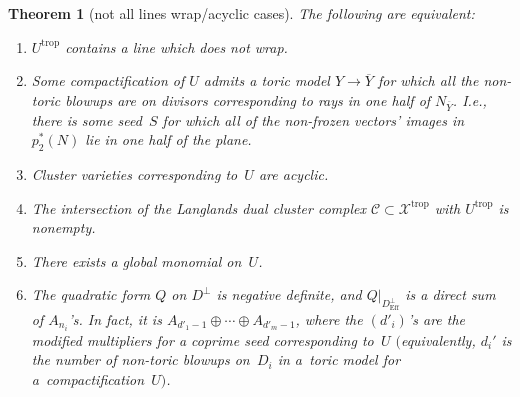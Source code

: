 \documentclass[11pt]{article}
\numberwithin{equation}{section}
\numberwithin{figure}{section}
\numberwithin{table}{section}
\DeclareMathOperator{\trop}{trop}
\DeclareMathOperator{\Eff}{Eff}
\let\?=\overline
\let\rar=\rightarrow
\let\s=\mathcal
\newtheorem{thm}{Theorem}[section]
\theoremstyle{definition}
\begin{document}
\setcounter{section}{4}
\setcounter{subsection}{2}
\setcounter{subsubsection}{0}
\setcounter{thm}{4}
\setcounter{equation}{0}
\begin{thm}[not all lines wrap/acyclic cases]\label{not-all-wrap}
The following are equivalent:
\begin{enumerate}\itemsep=0pt
\item[$1.$] $U^{\trop}$ contains a {line} which does not wrap.
\item[$2.$] Some compactification of $U$ admits a toric model $Y\rar \?{Y}$ for which all the non-toric blowups are on divisors corresponding to rays in one half of $N_{\?{Y}}$. I.e., there is some seed~$S$ for which all of the non-frozen vectors' images in~$p_2^*(N)$ lie in one half of the plane.
\item[$3.$] Cluster varieties corresponding to~$U$ are {acyclic}.
\item[$4.$] The intersection of the Langlands dual {cluster complex} $\s{C}\subset \s{X}^{\trop}$ with $U^{\trop}$ is non\-empty.
\item[$5.$] There exists a {global monomial} on~$U$.
\item[$6.$] The {quadratic form} $Q$ on $D^{\perp}$ is negative definite, and $Q|_{D^{\perp}_{\Eff}}$ is a direct sum of $A_{n_i}$'s. In fact, it is $A_{d'_1-1}\oplus \cdots \oplus A_{d'_m-1}$, where the $(d'_i)$'s are the modified multipliers for a coprime seed corresponding to~$U$ $($equivalently, $d_i'$ is the number of non-toric blowups on~$D_i$ in a~toric model for a~compactification~$U)$.
\end{enumerate}
\end{thm}
\end{document}
